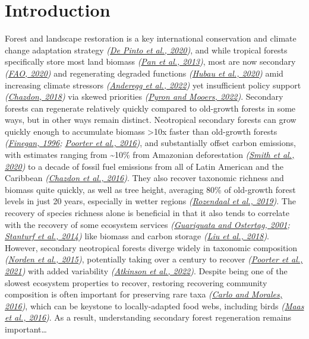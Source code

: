 \documentclass[
  12pt,
]{article}
\begin{document}
\newpage

\hypertarget{introduction}{%
\section{Introduction}\label{introduction}}

Forest and landscape restoration is a key international conservation and climate change adaptation strategy \emph{(\protect\hyperlink{ref-depinto20}{De Pinto et al., 2020})}, and while tropical forests specifically store most land biomass \emph{(\protect\hyperlink{ref-pan13}{Pan et al., 2013})}, most are now secondary \emph{(\protect\hyperlink{ref-fao20}{FAO, 2020})} and regenerating degraded functions \emph{(\protect\hyperlink{ref-hubau20}{Hubau et al., 2020})} amid increasing climate stressors \emph{(\protect\hyperlink{ref-anderegg22}{Anderegg et al., 2022})} yet insufficient policy support \emph{(\protect\hyperlink{ref-chazdon18}{Chazdon, 2018})} via skewed priorities \emph{(\protect\hyperlink{ref-pyron22}{Pyron and Mooers, 2022})}.
Secondary forests can regenerate relatively quickly compared to old-growth forests in some ways, but in other ways remain distinct.
Neotropical secondary forests can grow quickly enough to accumulate biomass \textgreater10x faster than old-growth forests \emph{(\protect\hyperlink{ref-finegan96}{Finegan, 1996}; \protect\hyperlink{ref-poorter16}{Poorter et al., 2016})}, and substantially offset carbon emissions, with estimates ranging from \textasciitilde10\% from Amazonian deforestation \emph{(\protect\hyperlink{ref-smith20}{Smith et al., 2020})} to a decade of fossil fuel emissions from all of Latin American and the Caribbean \emph{(\protect\hyperlink{ref-chazdon16}{Chazdon et al., 2016})}.
They also recover taxonomic richness and biomass quite quickly, as well as tree height, averaging 80\% of old-growth forest levels in just 20 years, especially in wetter regions \emph{(\protect\hyperlink{ref-rozendaal19}{Rozendaal et al., 2019})}.
The recovery of species richness alone is beneficial in that it also tends to correlate with the recovery of some ecosystem services \emph{(\protect\hyperlink{ref-guariguata01}{Guariguata and Ostertag, 2001}; \protect\hyperlink{ref-stanturf14}{Stanturf et al., 2014})} like biomass and carbon storage \emph{(\protect\hyperlink{ref-liu18}{Liu et al., 2018})}.
However, secondary neotropical forests diverge widely in taxonomic composition \emph{(\protect\hyperlink{ref-norden15}{Norden et al., 2015})}, potentially taking over a century to recover \emph{(\protect\hyperlink{ref-poorter21}{Poorter et al., 2021})} with added variability \emph{(\protect\hyperlink{ref-atkinson22}{Atkinson et al., 2022})}.
Despite being one of the slowest ecosystem properties to recover, restoring recovering community composition is often important for preserving rare taxa \emph{(\protect\hyperlink{ref-carlo16}{Carlo and Morales, 2016})}, which can be keystone to locally-adapted food webs, including birds \emph{(\protect\hyperlink{ref-maas16}{Maas et al., 2016})}.
As a result, understanding secondary forest regeneration remains important\ldots{}
\end{document}
